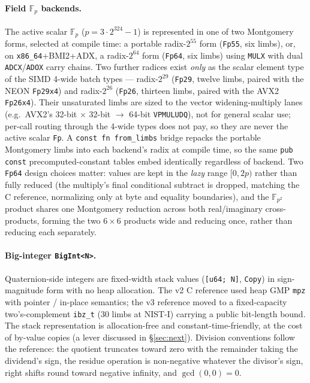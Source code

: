 \paragraph{Field $\mathbb{F}_p$ backends.}
The active scalar $\mathbb{F}_p$ ($p = 3\cdot 2^{324}-1$) is represented
in one of two Montgomery forms, selected at compile time: a portable radix-$2^{55}$
form (\texttt{Fp55}, six limbs), or, on \texttt{x86\_64}+BMI2+ADX, a
radix-$2^{64}$ form (\texttt{Fp64}, six limbs) using \texttt{MULX} with dual
\texttt{ADCX}/\texttt{ADOX} carry chains.  Two further radices exist
\emph{only} as the scalar element type of the SIMD 4-wide batch
types --- radix-$2^{29}$ (\texttt{Fp29}, twelve limbs, paired with the NEON
\texttt{Fp29x4}) and radix-$2^{26}$ (\texttt{Fp26}, thirteen limbs, paired with the
AVX2 \texttt{Fp26x4}).  Their unsaturated limbs are sized to the
vector widening-multiply lanes (e.g.\ AVX2's 32-bit $\times$ 32-bit
$\to$ 64-bit \texttt{VPMULUDQ}), not for general scalar use; per-call
routing
through the 4-wide types does not pay, so they are never the active
scalar \texttt{Fp}.  A \texttt{const fn from\_limbs} bridge repacks the
portable Montgomery limbs into each backend's radix at compile time,
so the same \texttt{pub const} precomputed-constant tables embed
identically regardless of backend.  Two \texttt{Fp64}
design choices matter: values are kept in the \emph{lazy} range
$[0,2p)$ rather than fully reduced (the multiply's final conditional
subtract is dropped, matching the C reference, normalizing only at
byte and equality boundaries), and the $\mathbb{F}_{p^2}$ product
shares one Montgomery reduction across both real/imaginary
cross-products, forming the two $6\times 6$ products wide and reducing
once, rather than reducing each separately.

\paragraph{Big-integer \texttt{BigInt<N>}.}
Quaternion-side integers are fixed-width stack values
(\texttt{[u64; N]}, \texttt{Copy}) in sign-magnitude form with no heap
allocation.  The v2 C reference used heap GMP \texttt{mpz} with pointer /
in-place semantics; the v3 reference moved to a fixed-capacity
two's-complement \texttt{ibz\_t} (30 limbs at NIST-I) carrying a public
bit-length bound.  The stack representation is allocation-free and
constant-time-friendly, at the cost of by-value copies (a lever
discussed in \S\ref{sec:next}).  Division conventions follow the
reference: the quotient truncates toward zero with the remainder taking
the dividend's sign, the residue operation is non-negative whatever the
divisor's sign, right shifts round toward negative infinity, and
$\gcd(0, 0) = 0$.


